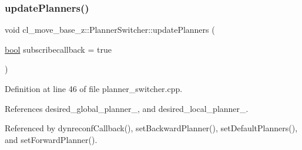 \subsubsection{\texorpdfstring{update\+Planners()}{updatePlanners()}}
{\footnotesize\ttfamily void cl\+\_\+move\+\_\+base\+\_\+z\+::\+Planner\+Switcher\+::update\+Planners (\begin{DoxyParamCaption}\item[{\hyperlink{classbool}{bool}}]{subscribecallback = {\ttfamily true} }\end{DoxyParamCaption})\hspace{0.3cm}{\ttfamily [private]}}



Definition at line 46 of file planner\+\_\+switcher.\+cpp.



References desired\+\_\+global\+\_\+planner\+\_\+, and desired\+\_\+local\+\_\+planner\+\_\+.



Referenced by dynreconf\+Callback(), set\+Backward\+Planner(), set\+Default\+Planners(), and set\+Forward\+Planner().


